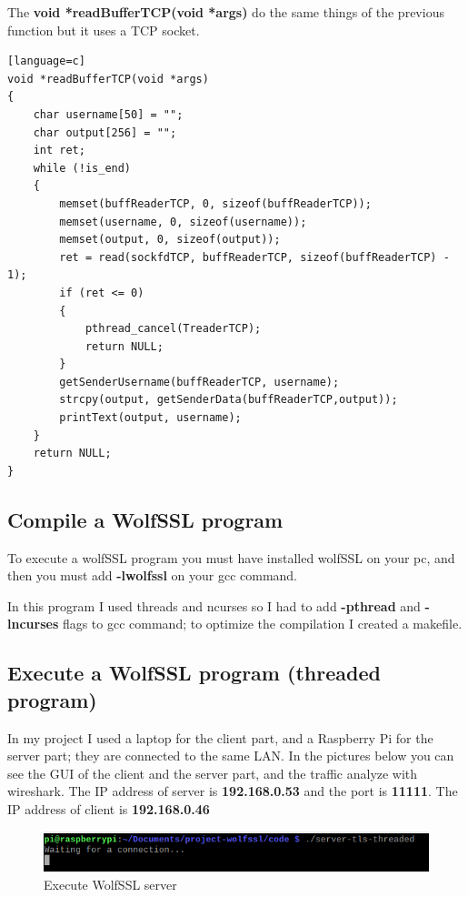 \documentclass[a4paper,12pt]{article}
\begin{document}
The \textbf{void *readBufferTCP(void *args)} do the same things of the previous function but it uses a TCP socket.
\begin{lstlisting}[caption={void *readBufferTCP(void *args) of TLS client},captionpos=b][language=c]
void *readBufferTCP(void *args)
{
    char username[50] = "";
    char output[256] = "";
    int ret;
    while (!is_end)
    {
        memset(buffReaderTCP, 0, sizeof(buffReaderTCP));
        memset(username, 0, sizeof(username));
        memset(output, 0, sizeof(output));
        ret = read(sockfdTCP, buffReaderTCP, sizeof(buffReaderTCP) - 1);
        if (ret <= 0)
        {
            pthread_cancel(TreaderTCP);
            return NULL;
        }
        getSenderUsername(buffReaderTCP, username);
        strcpy(output, getSenderData(buffReaderTCP,output));
        printText(output, username);
    }
    return NULL;
}
\end{lstlisting}

\subsection{Compile a WolfSSL program}
To execute a wolfSSL program you must have installed wolfSSL on your pc, and then you must add \textbf{-lwolfssl} on your gcc command.

In this program I used threads and ncurses so I had to add \textbf{-pthread} and \textbf{-lncurses} flags to gcc command; to optimize the compilation I created a makefile.

\subsection{Execute a WolfSSL program (threaded program)}
In my project I used a laptop for the client part, and a Raspberry Pi for the server part; they are connected to the same LAN.
In the pictures below you can see the GUI of the client and the server part, and the traffic analyze with wireshark.
The IP address of server is \textbf{192.168.0.53} and the port is \textbf{11111}.
The IP address of client is \textbf{192.168.0.46}\\

\begin{figure}[H]
    \centering
    \includegraphics[scale=0.65]{./code/img/1-server.png}
    \caption{Execute WolfSSL server}
    
\end{figure}
\end{document}

